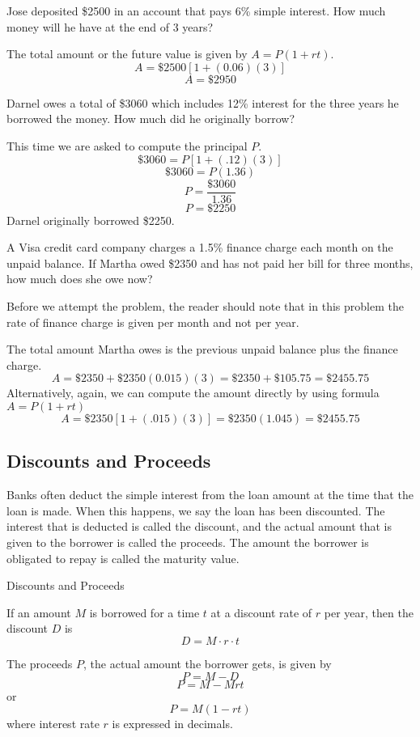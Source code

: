 \begin{example}
    Jose deposited \$2500 in an account that pays 6\% simple interest. How much money will he have at the end of 3 years?
\end{example}

\begin{solution}
    The total amount or the future value is given by \( A = P(1 + rt) \).
    \[ A = \$2500[1 + (0.06)(3)] \]
    \[ A = \$2950 \]
\end{solution}

\begin{example}
    Darnel owes a total of \$3060 which includes 12\% interest for the three years he borrowed the money. How much did he originally borrow?
\end{example}
\begin{solution}
    This time we are asked to compute the principal \( P \).
    \[ \$3060 = P[1 + (.12)(3)] \]
    \[ \$3060 = P(1.36) \]
    \[ P = \frac{\$3060}{1.36} \]
    \[ P = \$2250 \]
    Darnel originally borrowed \$2250.
\end{solution}

\begin{example}
    A Visa credit card company charges a 1.5\% finance charge each month on the unpaid balance. If Martha owed \$2350 and has not paid her bill for three months, how much does she owe now?
\end{example}
\begin{solution}
    Before we attempt the problem, the reader should note that in this problem the rate of finance charge is given per month and not per year.

    The total amount Martha owes is the previous unpaid balance plus the finance charge.
    \[ A = \$2350 + \$2350(0.015)(3) = \$2350 + \$105.75 = \$2455.75 \]
    Alternatively, again, we can compute the amount directly by using formula \( A = P(1 + rt) \)
    \[ A = \$2350[1 + (.015)(3)] = \$2350(1.045) = \$2455.75 \]
\end{solution}

\subsection{Discounts and Proceeds}
Banks often deduct the simple interest from the loan amount at the time that the loan is made.  When this happens, we say the loan has been discounted.  The interest that is deducted is called the discount, and the actual amount that is given to the borrower is called the proceeds.  The amount the borrower is obligated to repay is called the maturity value.

\begin{summarybox}{Discounts and Proceeds}

    If an amount \( M \) is borrowed for a time \( t \) at a discount rate of \( r \) per year, then the discount \( D \) is
    \[ D = M \cdot r \cdot t \]

    The proceeds \( P \), the actual amount the borrower gets, is given by
    \[ P = M - D \]
    \[ P = M - Mrt \]
    or
    \[ P = M(1 - rt) \]
    where interest rate \( r \) is expressed in decimals.
\end{summarybox}